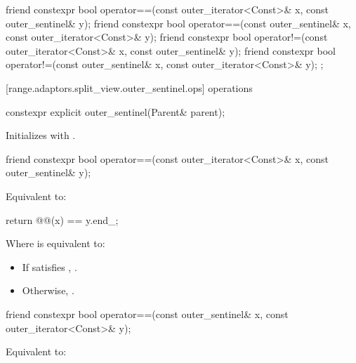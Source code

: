 {{\begin{codeblock}
{{{    friend constexpr bool operator==(const outer_iterator<Const>& x, const outer_sentinel& y);
    friend constexpr bool operator==(const outer_sentinel& x, const outer_iterator<Const>& y);
    friend constexpr bool operator!=(const outer_iterator<Const>& x, const outer_sentinel& y);
    friend constexpr bool operator!=(const outer_sentinel& x, const outer_iterator<Const>& y);
  };
}}
\end{codeblock}

[range.adaptors.split_view.outer_sentinel.ops]{ operations}

%
\begin{itemdecl}
constexpr explicit outer_sentinel(Parent& parent);
\end{itemdecl}

\begin{itemdescr}
\pnum
\effects Initializes  with .
\end{itemdescr}

%
\begin{itemdecl}
friend constexpr bool operator==(const outer_iterator<Const>& x, const outer_sentinel& y);
\end{itemdecl}

\begin{itemdescr}
\pnum
\effects Equivalent to:
\begin{codeblock}
return @@(x) == y.end_;
\end{codeblock}

Where  is equivalent to:
\begin{itemize}
\item If  satisfies , .
\item Otherwise, .
\end{itemize}
\end{itemdescr}

%
\begin{itemdecl}
friend constexpr bool operator==(const outer_sentinel& x, const outer_iterator<Const>& y);
\end{itemdecl}

\begin{itemdescr}
\pnum
\effects Equivalent to: 
\end{itemdescr}

}}
